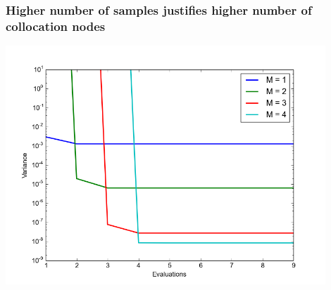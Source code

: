 \documentclass{beamer}
\begin{document}
\begin{frame}
 \frametitle{Higher number of samples justifies higher number of
 collocation nodes}
\includegraphics[width=0.9\textwidth]{k_convergence.png}
 \end{frame}



\end{document}

